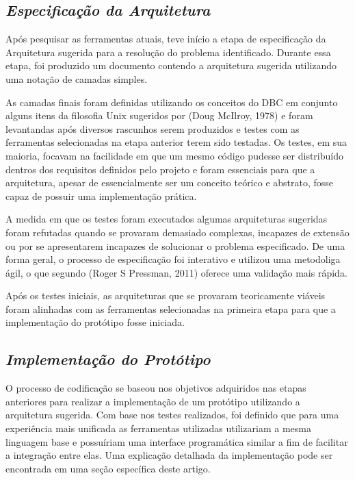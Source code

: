 \subsection{{\it Especificação da Arquitetura}}

Após pesquisar as ferramentas atuais, teve início a etapa de especificação da Arquitetura sugerida para a resolução do problema identificado. Durante essa etapa, foi produzido um documento contendo a arquitetura sugerida utilizando uma notação de camadas simples.

As camadas finais foram definidas utilizando os conceitos do DBC em conjunto alguns itens da filosofia Unix sugeridos por (Doug McIlroy, 1978) e foram levantandas após diversos rascunhos serem produzidos e testes com as ferramentas selecionadas na etapa anterior terem sido testadas. Os testes, em sua maioria, focavam na facilidade em que um mesmo código pudesse ser distribuído dentros dos requisitos definidos pelo projeto e foram essenciais para que a arquitetura, apesar de essencialmente ser um conceito teórico e abstrato, fosse capaz de possuir uma implementação prática. 

A medida em que os testes foram executados algumas arquiteturas sugeridas foram refutadas quando se provaram demasiado complexas, incapazes de extensão ou por se apresentarem incapazes de solucionar o problema especificado. De uma forma geral, o processo de especificação foi interativo e utilizou uma metodoliga ágil, o que segundo (Roger S Pressman, 2011) oferece uma validação mais rápida.

Após os testes iniciais, as arquiteturas que se provaram teoricamente viáveis foram alinhadas com as ferramentas selecionadas na primeira etapa para que a implementação do protótipo fosse iniciada.

\subsection{{\it Implementação do Protótipo}}

O processo de codificação se baseou nos objetivos adquiridos nas etapas anteriores para realizar a implementação de um protótipo utilizando a arquitetura sugerida. Com base nos testes realizados, foi definido que para uma experiência mais unificada as ferramentas utilizadas utilizariam a mesma linguagem base e possuíriam uma interface programática similar a fim de facilitar a integração entre elas. Uma explicação detalhada da implementação pode ser encontrada em uma seção específica deste artigo.

